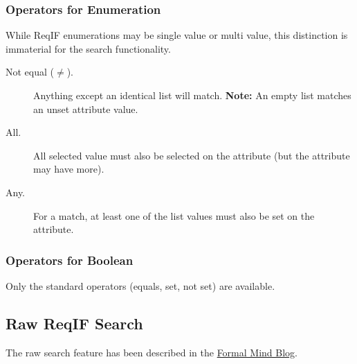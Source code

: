 \subsubsection{Operators for Enumeration}

While ReqIF enumerations may be single value or multi value, this distinction is immaterial for the search functionality.

\begin{description}
\item[Not equal ($\neq$).] Anything except an identical list will match.  \textbf{Note:} An empty list matches an unset attribute value.
\item[All.] All selected value must also be selected on the attribute (but the attribute may have more).
\item[Any.] For a match, at least one of the list values must also be set on the attribute.
\end{description}

\subsubsection{Operators for Boolean}

Only the standard operators (equals, set, not set) are available.


\subsection{Raw ReqIF Search}
\label{sec:raw_search}

The raw search feature has been described in the \href{http://formalmind.com/en/blog/formalmind-studio-pror-improvements-and-beta-program-about-start}{Formal Mind Blog}.


